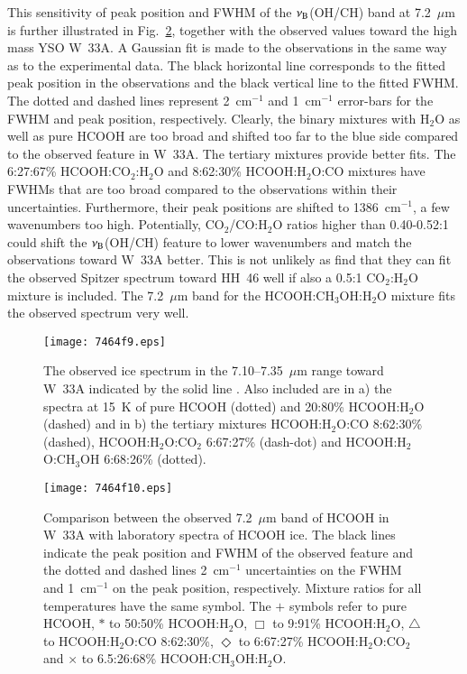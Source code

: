 \documentclass{aa}
\begin{document}
This sensitivity of peak position and FWHM of the $\nu_{\rm B}$(OH/CH)
band at 7.2~$\mu$m is further illustrated in Fig.~\ref{peakshape},
together with the observed values toward the high mass YSO W~33A. A
Gaussian fit is made to the observations in the same way as to the
experimental data. The black horizontal line corresponds to the fitted
peak position in the observations and the black vertical line to the
fitted FWHM. The dotted and dashed lines represent 2~cm$^{-1}$ and
1~cm$^{-1}$ error-bars for the FWHM and peak position,
respectively. Clearly, the binary mixtures with H$_2$O as well as pure
HCOOH are too broad and shifted too far to the blue side compared to
the observed feature in W~33A. The tertiary mixtures provide better
fits. The 6:27:67\% HCOOH:CO$_2$:H$_2$O and 8:62:30\% HCOOH:H$_2$O:CO
mixtures have FWHMs that are too broad compared to the observations
within their uncertainties. Furthermore, their peak positions are
shifted to 1386~cm$^{-1}$, a few wavenumbers too high. Potentially,
CO$_2$/CO:H$_2$O ratios higher than 0.40-0.52:1 could shift the
$\nu_{\rm B}$(OH/CH) feature to lower wavenumbers and match the
observations toward W~33A better. This is not unlikely as
\citet{oberg2007} find that they can fit the observed Spitzer spectrum
toward HH~46 well if also a 0.5:1 CO$_2$:H$_2$O mixture is
included. The 7.2~$\mu$m band for the HCOOH:CH$_3$OH:H$_2$O mixture
fits the observed spectrum very well.

\begin{figure}
\centering
\texttt{[image: 7464f9.eps]}
\caption{The observed ice spectrum in the 7.10--7.35~$\mu$m range
  toward W~33A indicated by the solid line \citep{gibb2000b}. Also
  included are in a) the spectra at 15~K of pure HCOOH (dotted) and
  20:80\% HCOOH:H$_2$O (dashed) and in b) the tertiary mixtures
  HCOOH:H$_2$O:CO 8:62:30\% (dashed), HCOOH:H$_2$O:CO$_2$ 6:67:27\%
  (dash-dot) and HCOOH:H$_2$O:CH$_3$OH 6:68:26\% (dotted).}\label{obs}
\end{figure}

\begin{figure}
\centering
\texttt{[image: 7464f10.eps]}
\caption{Comparison between the observed 7.2~$\mu$m band of HCOOH in
  W~33A with laboratory spectra of HCOOH ice. The black lines indicate
  the peak position and FWHM of the observed feature and the dotted
  and dashed lines 2~cm$^{-1}$ uncertainties on the FWHM and
  1~cm$^{-1}$ on the peak position, respectively. Mixture ratios for
  all temperatures have the same symbol. The $+$ symbols refer to pure
  HCOOH, $\ast$ to 50:50\% HCOOH:H$_2$O, $\Box$ to 9:91\%
  HCOOH:H$_2$O, $\bigtriangleup$ to HCOOH:H$_2$O:CO 8:62:30\%,
  $\Diamond$ to 6:67:27\% HCOOH:H$_2$O:CO$_2$ and $\times$ to
  6.5:26:68\% HCOOH:CH$_3$OH:H$_2$O.}\label{peakshape}
\end{figure}
\end{document}
